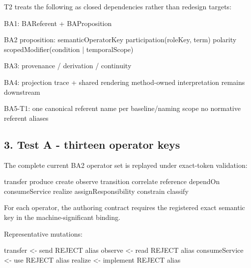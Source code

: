 \documentclass[
  10pt,
  a4paper,
]{article}
\newenvironment{Shaded}{}{}
\newcommand{\NormalTok}[1]{#1}
\begin{document}
T2 treats the following as closed dependencies rather than redesign
targets:

\begin{Shaded}
\begin{Highlighting}[]
\NormalTok{BA1: BAReferent + BAProposition}

\NormalTok{BA2 proposition:}
\NormalTok{  semanticOperatorKey}
\NormalTok{  participation(roleKey, term)}
\NormalTok{  polarity}
\NormalTok{  scopedModifier(condition | temporalScope)}

\NormalTok{BA3:}
\NormalTok{  provenance / derivation / continuity}

\NormalTok{BA4:}
\NormalTok{  projection trace + shared rendering}
\NormalTok{  method{-}owned interpretation remains downstream}

\NormalTok{BA5{-}T1:}
\NormalTok{  one canonical referent name per baseline/naming scope}
\NormalTok{  no normative referent aliases}
\end{Highlighting}
\end{Shaded}

\subsection{3. Test A - thirteen operator
keys}\label{test-a---thirteen-operator-keys}

The complete current BA2 operator set is replayed under exact-token
validation:

\begin{Shaded}
\begin{Highlighting}[]
\NormalTok{transfer}
\NormalTok{produce}
\NormalTok{create}
\NormalTok{observe}
\NormalTok{transition}
\NormalTok{correlate}
\NormalTok{reference}
\NormalTok{dependOn}
\NormalTok{consumeService}
\NormalTok{realize}
\NormalTok{assignResponsibility}
\NormalTok{constrain}
\NormalTok{classify}
\end{Highlighting}
\end{Shaded}

For each operator, the authoring contract requires the registered exact
semantic key in the machine-significant binding.

Representative mutations:

\begin{Shaded}
\begin{Highlighting}[]
\NormalTok{transfer \textless{}{-} send          REJECT alias}
\NormalTok{observe  \textless{}{-} read          REJECT alias}
\NormalTok{consumeService \textless{}{-} use     REJECT alias}
\NormalTok{realize  \textless{}{-} implement     REJECT alias}
\end{Highlighting}
\end{Shaded}
\end{document}

